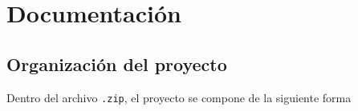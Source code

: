 \documentclass[a4paper,12pt]{article}
\begin{document}
\section{Documentación}

\subsection{Organización del proyecto}


Dentro del archivo \texttt{.zip}, el proyecto se compone de la siguiente forma\\
\end{document}

